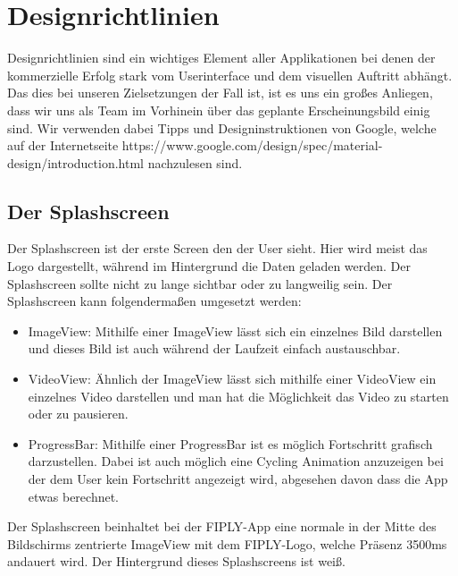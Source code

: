 \documentclass[FIPLY_base.tex]{subfiles}
\begin{document}
	
\section{Designrichtlinien}
Designrichtlinien sind ein wichtiges Element aller Applikationen bei denen der kommerzielle Erfolg stark vom Userinterface und dem visuellen Auftritt abhängt. Das dies bei unseren Zielsetzungen der Fall ist, ist es uns ein großes Anliegen, dass wir uns als Team im Vorhinein über das geplante Erscheinungsbild einig sind. Wir verwenden dabei Tipps und Designinstruktionen von Google, welche auf der Internetseite https://www.google.com/design/spec/material-design/introduction.html nachzulesen sind. 

\subsection{Der Splashscreen}
Der Splashscreen ist der erste Screen den der User sieht. Hier wird meist das Logo dargestellt, während im Hintergrund die Daten geladen werden.
Der Splashscreen sollte nicht zu lange sichtbar oder zu langweilig sein. Der Splashscreen kann folgendermaßen umgesetzt werden:
\begin{itemize}
	\item ImageView: Mithilfe einer ImageView lässt sich ein einzelnes Bild darstellen und dieses Bild ist auch während der Laufzeit einfach austauschbar.
	\item VideoView: Ähnlich der ImageView lässt sich mithilfe einer VideoView ein einzelnes Video darstellen und man hat die Möglichkeit das Video 
	zu starten oder zu pausieren.
	\item ProgressBar: Mithilfe einer ProgressBar ist es möglich Fortschritt grafisch darzustellen. Dabei ist auch möglich eine Cycling Animation anzuzeigen bei der dem User kein Fortschritt angezeigt wird, abgesehen davon dass die App etwas berechnet.
\end{itemize}
Der Splashscreen beinhaltet bei der FIPLY-App eine normale in der Mitte des Bildschirms zentrierte ImageView mit dem FIPLY-Logo, welche Präsenz 3500ms andauert wird. Der Hintergrund dieses Splashscreens ist weiß. 
\end{document}
